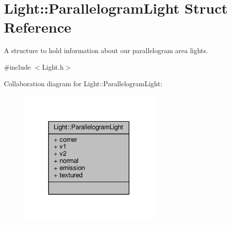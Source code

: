 \hypertarget{struct_light_1_1_parallelogram_light}{\section{Light\-:\-:Parallelogram\-Light Struct Reference}
\label{struct_light_1_1_parallelogram_light}
}


A structure to hold information about our parallelogram area lights.  




{\ttfamily \#include $<$Light.\-h$>$}



Collaboration diagram for Light\-:\-:Parallelogram\-Light\-:
\nopagebreak
\begin{figure}[H]
\begin{center}
\leavevmode
\includegraphics[width=202pt]{struct_light_1_1_parallelogram_light__coll__graph}
\end{center}
\end{figure}
